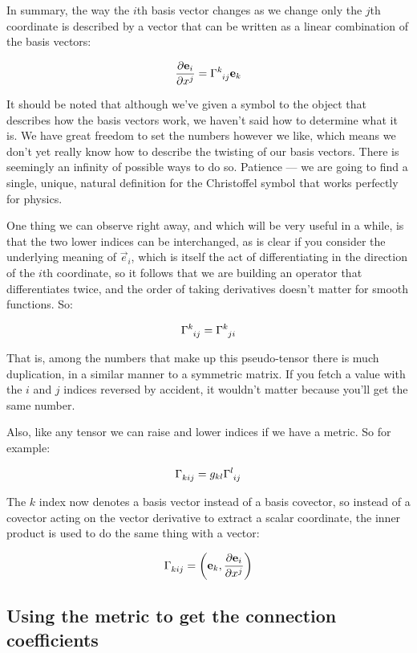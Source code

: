 In summary, the way the $i$th basis vector changes as we change only the $j$th coordinate is described by a vector that can be written as a linear combination of the basis vectors:

$$
\frac{\partial \vec{e}_i}{\partial x^j}
= \Gamma\indices{^k_i_j} \vec{e}_k
$$

It should be noted that although we've given a symbol to the object that describes how the basis vectors work, we haven't said how to determine what it is. We have great freedom to set the numbers however we like, which means we don't yet really know how to describe the twisting of our basis vectors. There is seemingly an infinity of possible ways to do so. Patience --- we are going to find a single, unique, natural definition for the Christoffel symbol that works perfectly for physics.

One thing we can observe right away, and which will be very useful in a while, is that the two lower indices can be interchanged, as is clear if you consider the underlying meaning of $\vec{e}_i$, which is itself the act of differentiating in the direction of the $i$th coordinate, so it follows that we are building an operator that differentiates twice, and the order of taking derivatives doesn't matter for smooth functions. So:

$$
\Gamma\indices{^k_i_j} = \Gamma\indices{^k_j_i}
$$

That is, among the numbers that make up this pseudo-tensor there is much duplication, in a similar manner to a symmetric matrix. If you fetch a value with the $i$ and $j$ indices reversed by accident, it wouldn't matter because you'll get the same number.

Also, like any tensor we can raise and lower indices if we have a metric. So for example:

$$
\Gamma\indices{_k_i_j} 
= 
g_{kl}
\Gamma\indices{^l_i_j}
$$

The $k$ index now denotes a basis vector instead of a basis covector, so instead of a covector acting on the vector derivative to extract a scalar coordinate, the inner product is used to do the same thing with a vector:

$$
\Gamma\indices{_k_i_j} = \left( \vec{e}_k , \frac{\partial \vec{e}_i}{\partial x^j} \right)
$$

\subsection{Using the metric to get the connection coefficients}

